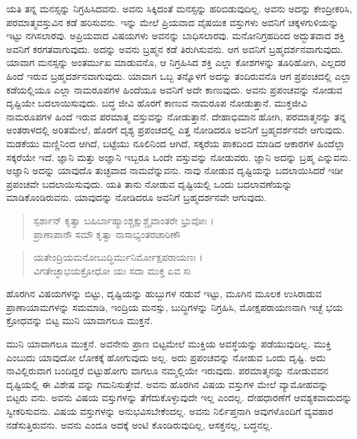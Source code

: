 ಯತಿ ತನ್ನ ಮನಸ್ಸನ್ನು ನಿಗ್ರಹಿಸಿದವನು. ಅವನು ಸಿಕ್ಕಿದಂತೆ ಮನಸ್ಸನ್ನು ಹರಿಬಿಡುವುದಿಲ್ಲ. ಅವನು ಅದನ್ನು ಕೇಂದ್ರೀಕರಿಸಿ, ಪರಮಾತ್ಮವಸ್ತುವಿನ ಕಡೆ ಹರಿಸುವನು. ಇನ್ನು ಮೇಲೆ ಪ್ರಿಯವಾದ ವೈಷಯಿಕ ವಸ್ತುಗಳು ಅವನಿಗೆ ಚಕ್ಕಳಗುಳಿಯನ್ನು ಇಟ್ಟು ನಗಿಸಲಾರವು. ಅಪ್ರಿಯವಾದ ವಿಷಯಗಳು ಅವನನ್ನು ಬಾಧಿಸಲಾರವು. ಮನೋನಿಗ್ರಹದಿಂದ ಅದ್ಭುತವಾದ ಶಕ್ತಿ ಅವನಿಗೆ ಕರಗತವಾಗುವುದು. ಅದನ್ನು ಅವನು ಬ್ರಹ್ಮನ ಕಡೆ ತಿರುಗಿಸುವನು. ಆಗ ಅವನಿಗೆ ಬ್ರಹ್ಮದರ್ಶನವಾಗುವುದು. ಯಾವಾಗ ಮನಸ್ಸನ್ನು ಅಂತರ್ಮುಖ ಮಾಡುವನೊ, ಆ ನಿಗ್ರಹಿಸಿದ ಶಕ್ತಿ ಎಲ್ಲಾ ಕೋಶಗಳನ್ನು ತೂರಿಹೋಗಿ, ಎಲ್ಲದರ ಹಿಂದೆ ಇರುವ ಬ್ರಹ್ಮದರ್ಶನವಾಗುವುದು. ಯಾವಾಗ ಒಬ್ಬ ತನ್ನೊಳಗೆ ಅದನ್ನು ತಂದಿರುವನೊ ಆಗ ಪ್ರಪಂಚದಲ್ಲಿ ಎಲ್ಲಾ ಕಡೆಯಲ್ಲಿಯೂ ಎಲ್ಲಾ ನಾಮರೂಪಗಳ ಹಿಂದೆಯೂ ಅವನಿಗೆ ಅದೇ ಕಾಣುವುದು. ಅವನು ಪ್ರಪಂಚವನ್ನು ನೋಡುವ ದೃಷ್ಟಿಯೇ ಬದಲಾಯಿಸುವುದು. ಬದ್ಧ ಜೀವಿ ಹೊರಗೆ ಕಾಣುವ ನಾಮರೂಪ ನೋಡುತ್ತಾನೆ. ಮುಕ್ತಜೀವಿ ನಾಮರೂಪಗಳ ಹಿಂದೆ ಇರುವ ಪರಮಾತ್ಮ ವಸ್ತುವನ್ನು ನೋಡುತ್ತಾನೆ. ದೇಹಾಭಿಮಾನ ಹೋಗಿ, ಪರಮಾತ್ಮನನ್ನು ತನ್ನ ಅಂತರಾಳದಲ್ಲಿ ಅರಿತಮೇಲೆ, ಹೊರಗೆ ದೃಶ್ಯ ಪ್ರಪಂಚದಲ್ಲಿ ಎತ್ತ ನೋಡಿದರೂ ಅವನಿಗೆ ಬ್ರಹ್ಮದರ್ಶನವೇ ಆಗುವುದು. ಮಡಕೆಯು ಮಣ್ಣಿನಿಂದ ಆಗಿದೆ, ಬಟ್ಟೆಯು ನೂಲಿನಿಂದ ಆಗಿದೆ, ಸಕ್ಕರೆಯ ಪಾಕದಿಂದ ಮಾಡಿದ ಆಕಾರಗಳ ಹಿಂದೆಲ್ಲಾ ಸಕ್ಕರೆಯೇ ಇದೆ. ಜ್ಞಾನಿ ಮತ್ತು ಅಜ್ಞಾನಿ ಇಬ್ಬರೂ ಒಂದೇ ವಸ್ತುವನ್ನು ನೋಡುವರು. ಜ್ಞಾನಿ ಅದನ್ನು ಬ್ರಹ್ಮ ಎನ್ನುವನು. ಅಜ್ಞಾನಿ ಅದನ್ನು ಯಾವುದೊ ತುಚ್ಛವಾದ ನಾಮವೆನ್ನುವನು. ನಾವು ನೋಡುವ ದೃಷ್ಟಿಯನ್ನು ಬದಲಾಯಿಸಿದರೆ ಇಡೀ ಪ್ರಪಂಚವೇ ಬದಲಾಯಿಸುವುದು. ಯತಿ ತಾನು ನೋಡುವ ದೃಷ್ಟಿಯಲ್ಲಿ ಒಂದು ಬದಲಾವಣೆಯನ್ನು ಮಾಡಿಕೊಂಡಿರುವನು. ಯಾವುದನ್ನು ನೋಡಿದರೂ ಅವನಿಗೆ ಬ್ರಹ್ಮದರ್ಶನವೇ ಆಗುವುದು.

\begin{verse}
ಸ್ಪರ್ಶಾನ್ ಕೃತ್ವಾ ಬಹಿರ್ಬಾಹ್ಯಾಂಶ್ಚಕ್ಷುಶ್ಚೈವಾಂತರೇ ಭ್ರುವೋಃ ।\\ಪ್ರಾಣಾಪಾನೌ ಸಮೌ ಕೃತ್ವಾ ನಾಸಾಭ್ಯಂತರಚಾರಿಣೌ 
\end{verse}

\begin{verse}
ಯತೇಂದ್ರಿಯಮನೋಬುದ್ಧಿರ್ಮುನಿರ್ಮೋಕ್ಷಪರಾಯಣಃ ।\\ವಿಗತೇಚ್ಛಾಭಯಕ್ರೋಧೋ ಯಃ ಸದಾ ಮುಕ್ತ ಏವ ಸಃ 
\end{verse}

{\small ಹೊರಗಿನ ವಿಷಯಗಳನ್ನು ಬಿಟ್ಟು, ದೃಷ್ಟಿಯನ್ನು ಹುಬ್ಬುಗಳ ನಡುವೆ ಇಟ್ಟು, ಮೂಗಿನ ಮೂಲಕ ಉಸಿರಾಡುವ ಪ್ರಾಣಾಯಾಮಗಳನ್ನು ಸಮಮಾಡಿ, ಇಂದ್ರಿಯ ಮನಸ್ಸು, ಬುದ್ಧಿಗಳನ್ನು ನಿಗ್ರಹಿಸಿ, ಮೋಕ್ಷಪರಾಯಣನಾಗಿ ಇಚ್ಛೆ ಭಯ ಕ್ರೋಧವನ್ನು ಬಿಟ್ಟ ಮುನಿ ಯಾವಾಗಲೂ ಮುಕ್ತನೆ.}

ಮುನಿ ಯಾವಾಗಲೂ ಮುಕ್ತನೆ. ಅವನೇನು ಪ್ರಾಣ ಬಿಟ್ಟಮೇಲೆ ಮುಕ್ತಿಯ ಅವಸ್ಥೆಯನ್ನು ಪಡೆಯುವುದಿಲ್ಲ. ಮುಕ್ತಿ ಎಂಬುದು ಯಾವುದೋ ಲೋಕಕ್ಕೆ ಹೋಗುವುದು ಅಲ್ಲ. ಅದು ಪ್ರಪಂಚವನ್ನು ನೋಡುವ ಒಂದು ದೃಷ್ಟಿ. ಅದು ನಾವಿಲ್ಲಿರುವಾಗ ಬಂದಿದ್ದರೆ ಬಿಟ್ಟುಹೋಗು ವಾಗಲೂ ನಮ್ಮಲ್ಲಿಯೇ ಇರುವುದು. ಪರಮಾತ್ಮನನ್ನು ನೋಡುವವನ ದೃಷ್ಟಿಯಲ್ಲಿ ಈ ವಿಶೇಷ ವನ್ನು ಗಮನಿಸುತ್ತೇವೆ. ಅವನು ಹೊರಗಿನ ವಿಷಯ ವಸ್ತುಗಳ ಮೇಲೆ ವ್ಯಾಮೋಹವನ್ನು ಬಿಟ್ಟರು ವನು. ಅವನು ವಿಷಯ ವಸ್ತುಗಳನ್ನು ತೆಗೆದುಕೊಳ್ಳುವುದೇ ಇಲ್ಲ ಎಂದಲ್ಲ. ದೇಹಧಾರಣೆಗೆ ಆವಶ್ಯಕವಾದುದನ್ನು ಸ್ವೀಕರಿಸುವನು. ವಿಷಯ ವಸ್ತುಗಳನ್ನು ಅನುಭವಿಸಬೇಕೆಂದಲ್ಲ. ಅವನು ನಿರ್ಲಿಪ್ತನಾಗಿ ಅವುಗಳೊಂದಿಗೆ ವ್ಯವಹಾರ ನಡೆಸುತ್ತಿರುವನು. ಅವನು ಎಂದೂ ಅದಕ್ಕೆ ಅಂಟಿ ಕೊಂಡಿರುವುದಿಲ್ಲ, ಆಸಕ್ತನಲ್ಲ, ಬದ್ಧನಲ್ಲ.

